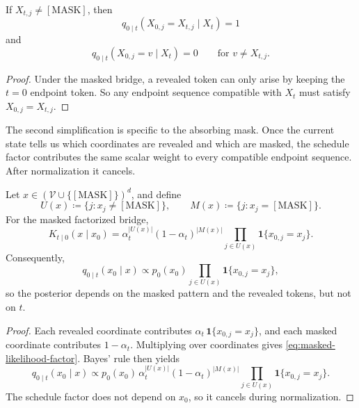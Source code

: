 \documentclass[11pt]{article}
\begin{document}
\begin{corollary}
\label{cor:masked-revealed}
If \(X_{t,j}\neq [\mathrm{MASK}]\), then
\[
  q_{0\mid t}(X_{0,j}=X_{t,j}\mid X_t)=1
\]
and
\[
  q_{0\mid t}(X_{0,j}=v\mid X_t)=0
  \qquad \text{for } v\neq X_{t,j}.
\]
\end{corollary}
\begin{proof}
Under the masked bridge, a revealed token can only arise by keeping the \(t=0\) endpoint token.
So any endpoint sequence compatible with \(X_t\) must satisfy \(X_{0,j}=X_{t,j}\).%
\end{proof}

The second simplification is specific to the absorbing mask.
Once the current state tells us which coordinates are revealed and which are masked, the schedule factor contributes the same scalar weight to every compatible endpoint sequence.
After normalization it cancels.

\begin{proposition}
\label{prop:masked-time-independent}
Let \(x\in(\mathcal{V}\cup\{[\mathrm{MASK}]\})^d\), and define
\[
  U(x)\coloneqq \{j:x_j\neq [\mathrm{MASK}]\},
  \qquad
  M(x)\coloneqq \{j:x_j=[\mathrm{MASK}]\}.
\]
For the masked factorized bridge,
\begin{equation}
  K_{t\mid 0}(x\mid x_0)
  =
  \alpha_t^{|U(x)|}(1-\alpha_t)^{|M(x)|}
  \prod_{j\in U(x)} \mathbf{1}\{x_{0,j}=x_j\}.
  \label{eq:masked-likelihood-factor}
\end{equation}
Consequently,
\begin{equation}
  q_{0\mid t}(x_0\mid x)
  \propto
  p_0(x_0)\prod_{j\in U(x)}\mathbf{1}\{x_{0,j}=x_j\},
  \label{eq:masked-posterior-t-free}
\end{equation}
so the posterior depends on the masked pattern and the revealed tokens, but not on \(t\).
\end{proposition}
\begin{proof}
Each revealed coordinate contributes \(\alpha_t\,\mathbf{1}\{x_{0,j}=x_j\}\), and each masked coordinate contributes \(1-\alpha_t\).
Multiplying over coordinates gives \eqref{eq:masked-likelihood-factor}.
Bayes' rule then yields
\[
  q_{0\mid t}(x_0\mid x)
  \propto
  p_0(x_0)\,\alpha_t^{|U(x)|}(1-\alpha_t)^{|M(x)|}
  \prod_{j\in U(x)}\mathbf{1}\{x_{0,j}=x_j\}.
\]
The schedule factor does not depend on \(x_0\), so it cancels during normalization.%
\end{proof}
\end{document}
